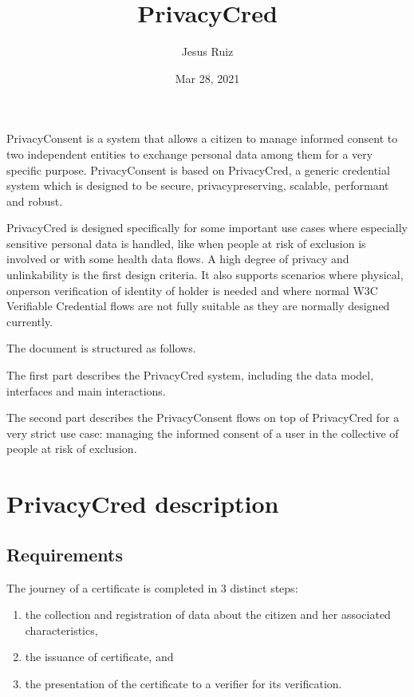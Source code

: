 \documentclass[letterpaper,10pt,english]{sphinxmanual}
\title{PrivacyCred}
\date{Mar 28, 2021}
\author{Jesus Ruiz}
\begin{document}
\pagestyle{empty}
\sphinxmaketitle
\pagestyle{plain}
\sphinxtableofcontents
\pagestyle{normal}
\label{\detokenize{index::doc}}


\sphinxAtStartPar
PrivacyConsent is a system that allows a citizen to manage informed consent to two independent entities to exchange personal data among them for a very specific purpose. PrivacyConsent is based on PrivacyCred, a generic credential system which is designed to be secure, privacy\sphinxhyphen{}preserving, scalable, performant and robust.

\sphinxAtStartPar
PrivacyCred is designed specifically for some important use cases where especially sensitive personal data is handled, like when people at risk of exclusion is involved or with some health data flows. A high degree of privacy and unlinkability is the first design criteria. It also supports scenarios where physical, on\sphinxhyphen{}person verification of identity of holder is needed and where normal W3C Verifiable Credential flows are not fully suitable as they are normally designed currently.

\sphinxAtStartPar
The document is structured as follows.

\sphinxAtStartPar
The first part describes the PrivacyCred system, including the data model, interfaces and main interactions.

\sphinxAtStartPar
The second part describes the PrivacyConsent flows on top of PrivacyCred for a very strict use case: managing the informed consent of a user in the collective of people at risk of exclusion.


\chapter{PrivacyCred description}
\label{\detokenize{privacycred:privacycred-description}}\label{\detokenize{privacycred::doc}}

\section{Requirements}
\label{\detokenize{privacycred:requirements}}
\sphinxAtStartPar
The journey of a certificate is completed in 3 distinct steps:
\begin{enumerate}
%
\item {} 
\sphinxAtStartPar
the collection and registration of data about the citizen and her associated characteristics,

\item {} 
\sphinxAtStartPar
the issuance of certificate, and

\item {} 
\sphinxAtStartPar
the presentation of the certificate to a verifier for its verification.

\end{enumerate}
\end{document}
